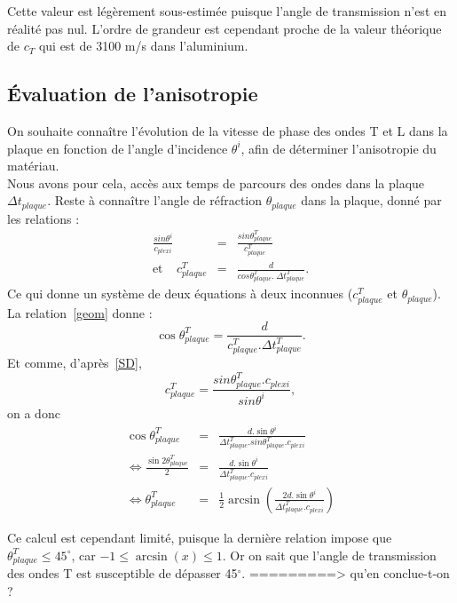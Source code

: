\documentclass[twoside]{article}
\begin{document}
\begin{multicols}{2}
Cette valeur est légèrement sous-estimée puisque l'angle de transmission n'est en réalité pas nul. L'ordre de grandeur est cependant proche de la valeur théorique de $c_{T}$ qui est de 3100 m/s dans l'aluminium.
	
	\subsection{Évaluation de l'anisotropie}
	On souhaite connaître l'évolution de la vitesse de phase des ondes T et L dans la plaque en fonction de l'angle d'incidence $\theta^{i}$, afin de déterminer l'anisotropie du matériau.\\
	
	Nous avons pour cela, accès aux temps de parcours des ondes dans la plaque $\Delta t_{plaque}$. Reste à connaître l'angle de réfraction $\theta_{plaque}$ dans la plaque, donné par les relations : 
\begin{eqnarray}
		\frac{sin\theta^{i}}{c_{plexi}} &=&\frac{sin\theta^{T}_{plaque}}{c_{plaque}^T} \label{SD}\\ \text{et}~~~~~
		c_{plaque}^T&=&\frac{d}{cos\theta_{plaque}^T. ~\Delta t_{plaque}^T} \label{geom}.	
\end{eqnarray}
Ce qui donne un système de deux équations à deux inconnues ($c_{plaque}^T$ et $\theta_{plaque}$).\\

La relation~\ref{geom} donne : $$\cos\theta^{T}_{plaque} = \frac{d}{c_{plaque}^T. \Delta t_{plaque}^T}.$$
Et comme, d'après~\ref{SD}, $$c_{plaque}^T = \frac{sin\theta^{T}_{plaque}.c_{plexi}}{sin\theta^{i}},$$ on a donc 
\begin{eqnarray*}
\cos\theta^{T}_{plaque}&=& \frac{d.\sin\theta^{i}}{\Delta t_{plaque}^T.sin\theta^{T}_{plaque}.c_{plexi}}\\
	\Leftrightarrow  \frac{\sin2\theta^{T}_{plaque}}{2}& = &\frac{d.\sin\theta^{i}}{\Delta t_{plaque}^T.c_{plexi}}\\
	\Leftrightarrow \theta^{T}_{plaque} &=& \frac{1}{2}\arcsin\left(\frac{2d.\sin\theta^{i}}{\Delta t_{plaque}^T.c_{plexi}}\right)
\end{eqnarray*}

Ce calcul est cependant limité, puisque la dernière relation impose que $\theta^{T}_{plaque}\leq 45^{\circ}$, car $-1\leq\arcsin(x) \leq1$. Or on sait que l'angle de transmission des ondes T est susceptible de dépasser 45$^{\circ}$.
=========> qu'en conclue-t-on ?\\


\end{multicols}
\end{document}
